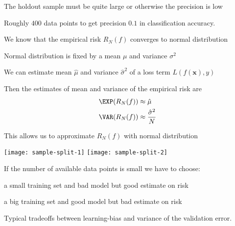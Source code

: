 \documentclass[landscape,footrule]{foils}
\renewcommand{\vec}[1]{\boldsymbol{#1}}
\begin{document}
The holdout sample must be quite large or otherwise the precision is low
\begin{triangles}
\item Roughly $400$ data points to get precision $0.1$ in classification accuracy.
\end{triangles}


We know that the empirical risk $R_N(f)$ converges to normal distribution
\begin{triangles}
\item Normal distribution is fixed by a mean $\mu$ and variance $\sigma^2$
\item We can estimate mean $\hat{\mu}$ and variance $\hat{\sigma}^2$ of a loss term $L(f(\vec{x}), y)$ 
\item Then the estimates of mean and variance of the empirical risk are
\begin{align*}
\EXP(R_N(f))&\approx \hat{\mu}\\
\VAR(R_N(f))&\approx \frac{\hat{\sigma}^2}{N}
\end{align*}
\item This allows us to approximate $R_N(f)$ with normal distribution 
\end{triangles}





\begin{center}
\texttt{[image: sample-split-1]}\hspace*{1cm}
\texttt{[image: sample-split-2]}
\end{center}
\vspace{-1cm}

If the number of available data points is small we have to choose:
\begin{triangles}
\item a small training set and bad model but good estimate on risk
\item a big training set and good model but bad estimate on risk
\end{triangles}


\vspace*{-.5cm}
Typical tradeoffs between learning-bias and variance of the validation error.   

\end{document}
